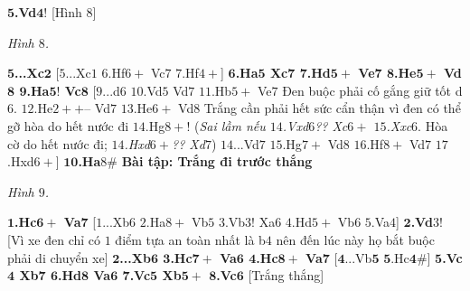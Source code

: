 \begin{multicols}{2}
	\vskip 0.1cm
	$\pmb{5}$\textbf{\color{gocco}.Vd}$\pmb{4!}$ [Hình $8$]
	\begin{center}
		\newgame
		\scalebox{0.8}\showboard
		\vskip 0.1cm
		\textit{\small\color{gocco}Hình $8$.}
	\end{center}
	$\pmb{5}$\textbf{\color{gocco}...Xc}$\pmb{2}$ [$5$...Xc$1$ $6$.Hf$6+$ Vc$7$ $7$.Hf$4+$]
	\vskip 0.1cm
	$\pmb{6}$\textbf{\color{gocco}.Ha$\pmb{5}$ Xc$\pmb{7}$ $\pmb{7}$.Hd$\pmb{5+}$ Ve$\pmb{7}$ $\pmb{8}$.He$\pmb{5+}$ Vd$\pmb{8}$ $\pmb{9}$.Ha$\pmb{5!}$ Vc}$\pmb{8}$ [$9$...d$6$ $10$.Vd$5$ Vd$7$ $11$.Hb$5+$ Ve$7$ Đen buộc phải cố gắng giữ tốt d$6$. $12$.He$2++–$ Vd$7$ $13$.He$6+$ Vd$8$ Trắng cần phải hết sức cẩn thận vì đen có thể gỡ hòa do hết nước đi $14$.Hg$8+!$ (\textit{Sai lầm nếu $14$.Vxd$6$?? Xc$6+$ $15$.Xxc$6$}. Hòa cờ do hết nước đi; \textit{$14$.Hxd$6+$?? Xd}$7$) $14$...Vd$7$ $15$.Hg$7+$ Vd$8$ $16$.Hf$8+$ Vd$7$ $17$.Hxd$6+$]
	\vskip 0.1cm
	$\pmb{10}$\textbf{\color{gocco}.Ha}$8\#$
	\vskip 0.1cm
	\textbf{\color{gocco}Bài tập: Trắng đi trước thắng}
	\begin{center}
		\newgame
		\scalebox{0.8}\showboard
		\vskip 0.1cm
		\textit{\small\color{gocco}Hình $9$.}
	\end{center}
	$\pmb{1}$\textbf{\color{gocco}.Hc$\pmb{6+}$ Va}$\pmb{7}$ [$1$...Xb$6$ $2$.Ha$8+$ Vb$5$ $3$.Vb$3!$ Xa$6$ $4$.Hd$5+$ Vb$6$ $5$.Va$4$]
	\vskip 0.1cm
	$\pmb{2}$\textbf{\color{gocco}.Vd}$3$! [Vì xe đen chỉ có $1$ điểm tựa an toàn nhất là b$4$ nên đến lúc này họ bắt buộc phải di chuyển xe]
	\vskip 0.1cm
	$\pmb{2}$\textbf{\color{gocco}...Xb$\pmb{6}$ $\pmb{3}$.Hc$\pmb{7+}$ Va$\pmb{6}$ $\pmb{4}$.Hc$\pmb{8+}$ Va}$\pmb{7}$ [$\pmb{4}$...Vb$\pmb{5}$ $\pmb{5}$.Hc$\pmb{4\#}$]
	\vskip 0.1cm
	$\pmb{5}$\textbf{\color{gocco}.Vc$\pmb{4}$ Xb$\pmb{7}$ $\pmb{6}$.Hd$\pmb{8}$ Va$\pmb{6}$ $\pmb{7}$.Vc$\pmb{5}$ Xb$\pmb{5+}$ $\pmb{8}$.Vc}$\pmb{6}$ [Trắng thắng]
\end{multicols}




